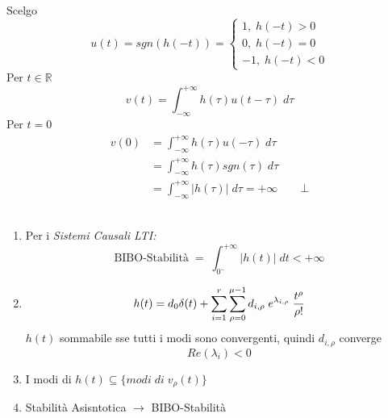 \documentclass{article}
\begin{document}
			Scelgo
			\[
				u(t) = sgn(h(-t)) =
				\begin{cases}
					1,\; h(-t) > 0 \\
					0,\; h(-t) = 0 \\
					-1,\; h(-t) < 0
				\end{cases}
			\]
			Per $ t \in \mathbb{R} $
			\[
				v(t) = \int_{-\infty}^{+\infty} {h(\tau)u(t-\tau)\; d\tau}
			\]
			Per $ t=0 $
			\[
				\begin{aligned}
					v(0) &= \int_{-\infty}^{+\infty} {h(\tau)u(-\tau)\; d\tau} \\
						 &= \int_{-\infty}^{+\infty} {h(\tau)sgn(\tau)\; d\tau} \\
						 &= \int_{-\infty}^{+\infty} {\left|h(\tau)\right|\; d\tau} = +\infty\quad\quad \bot
				\end{aligned}
			\]
			\\
			\begin{enumerate}
				\item Per i \textit{Sistemi Causali LTI:} \\
					  \[
					  	\text{BIBO-Stabilità}\; =\; \int_{0^-}^{+\infty} {\left|h(t)\right|\; dt} < +\infty
					  \]
				\item \[
						h(t) = d_0\delta(t) + \sum_{i=1}^{r} {\sum_{\rho = 0}^{\mu - 1} {d_{i, \rho}\; e^{\lambda_{i, \rho}}\; {t^{\rho}\over{\rho !}}}}
					  \]
					  $ h(t) $ sommabile sse tutti i modi sono convergenti, quindi $ d_{i, \rho} $ converge
					  \[
					  	Re(\lambda_i) < 0
					  \]
				\item I modi di $ h(t) \subseteq \{modi\; di\; v_\rho (t)\} $
				\item Stabilità Asisntotica $ \rightarrow $ BIBO-Stabilità
			\end{enumerate}
\end{document}
